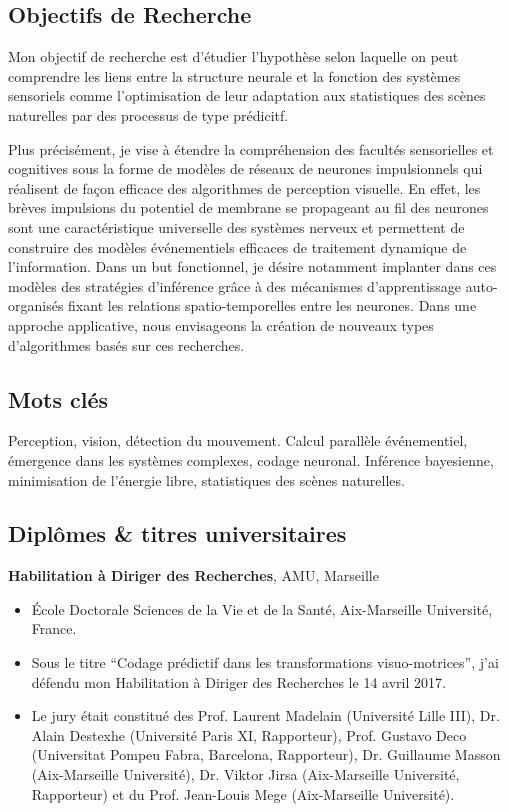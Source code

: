 \subsection*{Objectifs de Recherche}

Mon objectif de recherche est d'étudier l'hypothèse selon laquelle on peut comprendre les liens entre la structure neurale et la fonction des systèmes sensoriels comme l'optimisation de leur adaptation aux statistiques des scènes naturelles par des processus de type prédicitf.

Plus précisément, je vise à étendre la compréhension des facultés sensorielles et cognitives sous la forme de modèles de réseaux de neurones impulsionnels qui réalisent de façon efficace des algorithmes de  perception visuelle. En effet, les brèves impulsions du potentiel de membrane se propageant au fil des neurones sont une caractéristique universelle des systèmes nerveux et permettent de construire des modèles événementiels efficaces de traitement dynamique de l'information. Dans un but fonctionnel, je désire notamment implanter dans ces modèles des stratégies d'inférence grâce à des mécanismes d'apprentissage auto-organisés fixant les relations spatio-temporelles entre les neurones. Dans une approche applicative, nous envisageons la création de nouveaux types d'algorithmes basés sur ces recherches.

\subsection*{Mots clés}
Perception, vision, détection du mouvement. Calcul parallèle événementiel, émergence dans les systèmes complexes, codage neuronal. Inférence bayesienne, minimisation de l'énergie libre, statistiques des scènes naturelles.

\subsection{Diplômes \& titres universitaires}

\textbf{Habilitation à Diriger des Recherches}, AMU, Marseille\hfill {}\\
\vspace*{-.15in}
\begin{itemize}
\item[] \'Ecole Doctorale Sciences de la Vie et de la Santé, Aix-Marseille Université, France. 
\item[] Sous le titre ``Codage prédictif dans les transformations visuo-motrices'', j'ai défendu mon Habilitation à Diriger des Recherches le 14 avril 2017.
\item[] Le jury était constitué des Prof. Laurent Madelain (Université Lille III), Dr. Alain Destexhe (Université Paris XI, Rapporteur), Prof. Gustavo Deco (Universitat Pompeu Fabra, Barcelona, Rapporteur), Dr. Guillaume Masson (Aix-Marseille Université), Dr. Viktor Jirsa (Aix-Marseille Université, Rapporteur) et du Prof. Jean-Louis Mege (Aix-Marseille Université).
\end{itemize} %


